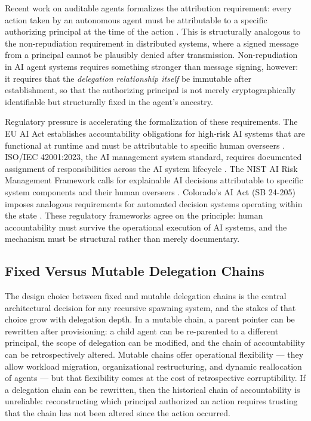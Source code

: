 Recent work on auditable agents formalizes the attribution requirement: every action taken by an autonomous agent must be attributable to a specific authorizing principal at the time of the action \cite{arxiv2604.05485}. This is structurally analogous to the non-repudiation requirement in distributed systems, where a signed message from a principal cannot be plausibly denied after transmission. Non-repudiation in AI agent systems requires something stronger than message signing, however: it requires that the \emph{delegation relationship itself} be immutable after establishment, so that the authorizing principal is not merely cryptographically identifiable but structurally fixed in the agent's ancestry.

Regulatory pressure is accelerating the formalization of these requirements. The EU AI Act establishes accountability obligations for high-risk AI systems that are functional at runtime and must be attributable to specific human overseers \cite{eu-ai-act}. ISO/IEC 42001:2023, the AI management system standard, requires documented assignment of responsibilities across the AI system lifecycle \cite{iso42001}. The NIST AI Risk Management Framework calls for explainable AI decisions attributable to specific system components and their human overseers \cite{nist-ai-rmf}. Colorado's AI Act (SB 24-205) imposes analogous requirements for automated decision systems operating within the state \cite{colorado-ai-act}. These regulatory frameworks agree on the principle: human accountability must survive the operational execution of AI systems, and the mechanism must be structural rather than merely documentary.

\subsection{Fixed Versus Mutable Delegation Chains}
\label{sec:fixed-vs-mutable}

The design choice between fixed and mutable delegation chains is the central architectural decision for any recursive spawning system, and the stakes of that choice grow with delegation depth. In a mutable chain, a parent pointer can be rewritten after provisioning: a child agent can be re-parented to a different principal, the scope of delegation can be modified, and the chain of accountability can be retrospectively altered. Mutable chains offer operational flexibility — they allow workload migration, organizational restructuring, and dynamic reallocation of agents — but that flexibility comes at the cost of retrospective corruptibility. If a delegation chain can be rewritten, then the historical chain of accountability is unreliable: reconstructing which principal authorized an action requires trusting that the chain has not been altered since the action occurred.

